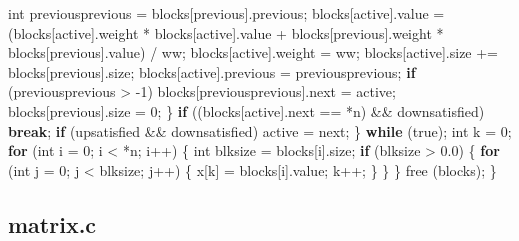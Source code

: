 \documentclass[
  12pt,
]{book}
\newenvironment{Shaded}{\begin{snugshade}}{\end{snugshade}}
\newcommand{\ControlFlowTok}[1]{\textcolor[rgb]{0.13,0.29,0.53}{\textbf{#1}}}
\newcommand{\DataTypeTok}[1]{\textcolor[rgb]{0.13,0.29,0.53}{#1}}
\newcommand{\DecValTok}[1]{\textcolor[rgb]{0.00,0.00,0.81}{#1}}
\newcommand{\FloatTok}[1]{\textcolor[rgb]{0.00,0.00,0.81}{#1}}
\newcommand{\NormalTok}[1]{#1}
\theoremstyle{definition}
\theoremstyle{definition}
\theoremstyle{definition}
\theoremstyle{definition}
\theoremstyle{remark}
\begin{document}
\begin{Shaded}
\begin{Highlighting}[]
            \DataTypeTok{int}\NormalTok{ previousprevious = blocks[previous].previous;}
\NormalTok{            blocks[active].value = (blocks[active].weight * blocks[active].value + blocks[previous].weight * blocks[previous].value) / ww;}
\NormalTok{            blocks[active].weight = ww;}
\NormalTok{            blocks[active].size += blocks[previous].size;}
\NormalTok{            blocks[active].previous = previousprevious;}
            \ControlFlowTok{if}\NormalTok{ (previousprevious \textgreater{} {-}}\DecValTok{1}\NormalTok{)}
\NormalTok{                blocks[previousprevious].next = active;}
\NormalTok{            blocks[previous].size = }\DecValTok{0}\NormalTok{;}
\NormalTok{        \}}
        \ControlFlowTok{if}\NormalTok{ ((blocks[active].next == *n) \&\& downsatisfied) }\ControlFlowTok{break}\NormalTok{;}
        \ControlFlowTok{if}\NormalTok{ (upsatisfied \&\& downsatisfied) active = next;}
\NormalTok{    \} }\ControlFlowTok{while}\NormalTok{ (true);}
    \DataTypeTok{int}\NormalTok{ k = }\DecValTok{0}\NormalTok{;}
    \ControlFlowTok{for}\NormalTok{ (}\DataTypeTok{int}\NormalTok{ i = }\DecValTok{0}\NormalTok{; i \textless{} *n; i++) \{}
        \DataTypeTok{int}\NormalTok{ blksize = blocks[i].size;}
        \ControlFlowTok{if}\NormalTok{ (blksize \textgreater{} }\FloatTok{0.0}\NormalTok{) \{}
            \ControlFlowTok{for}\NormalTok{ (}\DataTypeTok{int}\NormalTok{ j = }\DecValTok{0}\NormalTok{; j \textless{} blksize; j++) \{}
\NormalTok{                x[k] = blocks[i].value;}
\NormalTok{                k++;}
\NormalTok{            \}}
\NormalTok{        \}}
\NormalTok{    \}}
\NormalTok{    free (blocks);}
\NormalTok{\}}
\end{Highlighting}
\end{Shaded}

\hypertarget{matrix.c}{%
\subsection{matrix.c}\label{matrix.c}}
\end{document}
